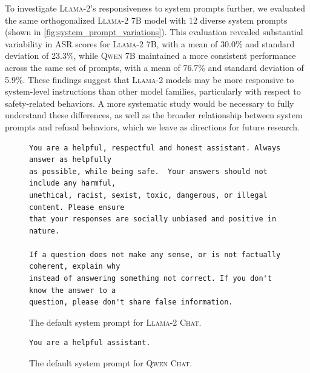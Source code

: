 \documentclass{article}
\begin{document}
To investigate \textsc{Llama-2}'s responsiveness to system prompts further, we evaluated the same orthogonalized \textsc{Llama-2 7B} model with 12 diverse system prompts (shown in \autoref{fig:system_prompt_variations}).
This evaluation revealed substantial variability in ASR scores for \textsc{Llama-2 7B}, with a mean of 30.0\% and standard deviation of 23.3\%, while \textsc{Qwen 7B} maintained a more consistent performance across the same set of prompts, with a mean of 76.7\% and standard deviation of 5.9\%.
These findings suggest that \textsc{Llama-2} models may be more responsive to system-level instructions than other model families, particularly with respect to safety-related behaviors.
A more systematic study would be necessary to fully understand these differences, as well as the broader relationship between system prompts and refusal behaviors, which we leave as directions for future research.

\begin{figure}[h]
\begin{tcolorbox}[left=1.5mm, right=1.5mm, top=1.5mm, bottom=1.5mm]
\raggedright
{\footnotesize
\begin{verbatim}
You are a helpful, respectful and honest assistant. Always answer as helpfully
as possible, while being safe.  Your answers should not include any harmful,
unethical, racist, sexist, toxic, dangerous, or illegal content. Please ensure
that your responses are socially unbiased and positive in nature.

If a question does not make any sense, or is not factually coherent, explain why
instead of answering something not correct. If you don't know the answer to a
question, please don't share false information.
\end{verbatim}
}
\end{tcolorbox}
\caption{The default system prompt for \textsc{Llama-2 Chat}.}
\label{fig:llama_2_chat_system_prompt}
\end{figure}

\begin{figure}[h]
\begin{tcolorbox}[left=1.5mm, right=1.5mm, top=1.5mm, bottom=1.5mm]
\raggedright
{\footnotesize
\begin{verbatim}
You are a helpful assistant.
\end{verbatim}
}
\end{tcolorbox}
\caption{The default system prompt for \textsc{Qwen Chat}.}
\label{fig:qwen_chat_system_prompt}
\end{figure}
\end{document}

